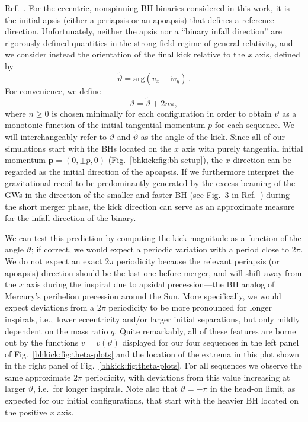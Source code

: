 Ref.~\cite{Sperhake:2019wwo}. For the eccentric, nonspinning BH
binaries considered in this work, it is the
initial apsis (either a periapsis or an apoapsis)
that defines a reference direction. Unfortunately,
neither the apsis nor a ``binary infall direction''
are rigorously defined
quantities in the strong-field regime of general relativity,
and we consider instead the orientation of the final
kick relative to the $x$ axis, defined by
%
\begin{equation}
  \tilde{\vartheta} = \mathrm{arg}(v_x + \mathrm{i}v_y)\,.
\end{equation}
For convenience, we define
\begin{equation}
    \vartheta = \tilde{\vartheta} + 2n\pi,
\end{equation}
where $n\geq 0$ is chosen minimally for each configuration in order to obtain
$\vartheta$ as a monotonic function of the initial tangential momentum $p$
for each sequence. We will interchangeably refer to $\vartheta$ 
and $\tilde{\vartheta}$ as the angle of the kick.
%
Since all of our simulations start with the BHs located on the $x$
axis with purely tangential initial momentum $\mathbf{p}=(0,\pm p,0)$
(Fig.~\ref{bhkick:fig:bh-setup}), the $x$ direction can be regarded as the
initial direction of the apoapsis. If we furthermore interpret the
gravitational recoil to be predominantly generated by the excess
beaming of the GWs in the direction of the smaller and faster BH (see
Fig.~3 in Ref.~\cite{Wiseman:1992dv}) during the short merger phase,
the kick direction can serve as an approximate measure for the infall
direction of the binary. 

We can test this prediction by computing the kick magnitude
as a function of the angle $\vartheta$; if correct, we would
expect a periodic variation with a period close to $2\pi$.
We do not expect an exact $2\pi$ periodicity because the
relevant periapsis (or apoapsis) direction should be the last one before merger,
and will shift away from the $x$ axis during the inspiral
due to 
apsidal precession---the BH analog
of Mercury's perihelion precession around the Sun. More
specifically, we would expect deviations from a $2\pi$ periodicity
to be more pronounced for longer inspirals, i.e.,~lower eccentricity
and/or larger initial separations, but only mildly
dependent on the mass ratio $q$.
Quite remarkably, all of these
features are borne out by the functions $v = v(\vartheta)$
displayed for our four sequences in the left panel of 
Fig.~\ref{bhkick:fig:theta-plots}
and the location of the extrema in this plot shown in 
the right panel of Fig.~\ref{bhkick:fig:theta-plots}.
For all sequences we observe the same approximate $2\pi$ periodicity,
with deviations from this value increasing at larger
$\vartheta$, i.e.~for longer inspirals.
Note also that $\vartheta=-\pi$ in the head-on limit, as expected
for our initial configurations, that start with the heavier BH
located on the positive $x$ axis.

